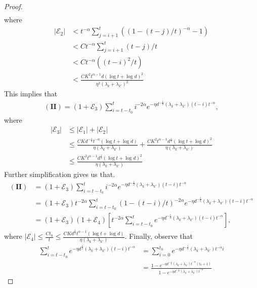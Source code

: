 \documentclass[10pt,a4paper]{amsart}
\begin{document}
\begin{proof}
\begin{align*}
\end{align*}
where
\begin{align*}
    |\mathcal E_2| &< t^{-\alpha}\sum_{j = i+1}^t ((1 - (t-j)/t)^{-\alpha} - 1)
    \\ 
    &< Ct^{-\alpha} \sum_{j = i+1}^t (t-j)/t
    \\
    &< Ct^{-\alpha}((t-i)^2/t)
    \\
    &< \frac{CK^2 t^{\alpha - 1} d(\log t + \log d)^2}{\eta^2 (\lambda_k + \lambda_{k'})^2}
\end{align*}
This implies that
\begin{align*}
(\mathbf{II}) = (1 + \mathcal E_3)\sum_{i = t-t_0}^t i^{-2\alpha} e^{-\eta d^{-\frac{1}{2}}(\lambda_k + \lambda_{k'})(t-i)t^{-\alpha}},
\end{align*}
where 
\begin{align*}
|\mathcal E_3| &\leq |\mathcal E_1| + |\mathcal E_2|
\\
&\leq \frac{CK d^{-\frac{1}{2}}t^{-\alpha} (\log t + \log d)}{\eta (\lambda_k + \lambda_{k'})} + \frac{CK^2 t^{\alpha - 1} d^{\frac{1}{2}}(\log t + \log d)^2}{\eta (\lambda_k + \lambda_{k'})}
\\
&\leq \frac{CK^2 t^{\alpha - 1} d^{\frac{1}{2}}(\log t + \log d)^2}{\eta (\lambda_k + \lambda_{k'})}
\end{align*}
Further simplification gives us that.
\begin{align*}
(\mathbf{II}) &= (1 + \mathcal E_3)\sum_{i = t-t_0}^t i^{-2\alpha} e^{-\eta d^{-\frac{1}{2}}(\lambda_k + \lambda_{k'}) (t-i)t^{-\alpha}}
\\
&= (1 + \mathcal E_3)t^{-2\alpha}\sum_{i = t-t_0}^t (1 - (t-i)/t)^{-2\alpha} e^{-\eta d^{-\frac{1}{2}}(\lambda_k + \lambda_{k'}) (t-i)t^{-\alpha}}
\\
&= (1 + \mathcal E_3)(1 + \mathcal E_4)[t^{-2\alpha}\sum_{i = t-t_0}^t e^{-\eta d^{-\frac{1}{2}}(\lambda_k + \lambda_{k'}) (t-i)t^{-\alpha}}],
\end{align*}
where $|\mathcal E_4| \leq \frac{Ct_0}{t} \leq \frac{CK d^{\frac{1}{2}}t^{\alpha - 1}(\log t + \log d)}{\eta (\lambda_k  + \lambda_{k'})}$. Finally, observe that
\begin{align*}
\sum_{i = t-t_0}^t e^{-\eta d^{\frac{1}{2}}(\lambda_k + \lambda_{k'})(t-i)t^{-\alpha}} &= \sum_{i = 0}^{t_0} e^{-\eta d^{-\frac{1}{2}}(\lambda_k + \lambda_{k'})t^{-\alpha}i}
\\
&= \frac{1 - e^{-\eta d^{-\frac{1}{2}}(\lambda_k + \lambda_{k'})t^{-\alpha}(t_0 + 1)}}{1 - e^{-\eta d^{-\frac{1}{2}}(\lambda_k + \lambda_{k'})t^{-\alpha}}}

\end{align*}
\end{proof}
\end{document}
